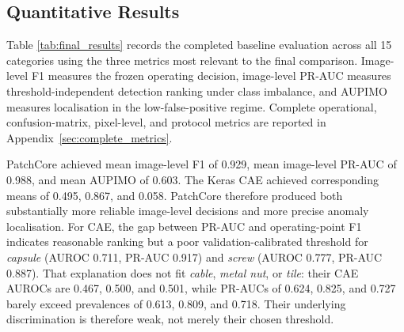\documentclass[11pt, a4paper]{article}
\begin{document}
\subsection{Quantitative Results}

Table \ref{tab:final_results} records the completed baseline evaluation across all 15 categories using the three metrics most relevant to the final comparison. Image-level F1 measures the frozen operating decision, image-level PR-AUC measures threshold-independent detection ranking under class imbalance, and AUPIMO measures localisation in the low-false-positive regime. Complete operational, confusion-matrix, pixel-level, and protocol metrics are reported in Appendix~\ref{sec:complete_metrics}.

PatchCore achieved mean image-level F1 of 0.929, mean image-level PR-AUC of 0.988, and mean AUPIMO of 0.603. The Keras CAE achieved corresponding means of 0.495, 0.867, and 0.058. PatchCore therefore produced both substantially more reliable image-level decisions and more precise anomaly localisation. For CAE, the gap between PR-AUC and operating-point F1 indicates reasonable ranking but a poor validation-calibrated threshold for \textit{capsule} (AUROC 0.711, PR-AUC 0.917) and \textit{screw} (AUROC 0.777, PR-AUC 0.887). That explanation does not fit \textit{cable}, \textit{metal nut}, or \textit{tile}: their CAE AUROCs are 0.467, 0.500, and 0.501, while PR-AUCs of 0.624, 0.825, and 0.727 barely exceed prevalences of 0.613, 0.809, and 0.718. Their underlying discrimination is therefore weak, not merely their chosen threshold.
\end{document}
